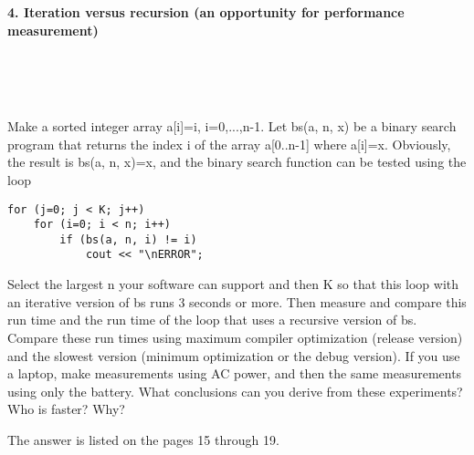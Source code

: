 \documentclass{article}
\begin{document}
\paragraph{}\
\paragraph{}\
\paragraph{}\

	\rmfamily
	
	\paragraph{4. Iteration versus recursion (an opportunity for performance measurement) }\
	
	\rmfamily\
	
		Make a sorted integer array a[i]=i, i=0,...,n-1.  Let bs(a, n, x) be a binary search program that returns the index i of the array a[0..n-1] where a[i]=x. Obviously, the result is bs(a, n, x)=x, and the binary search function can be tested using the loop
		
		\begin{verbatim}
for (j=0; j < K; j++)
    for (i=0; i < n; i++)
        if (bs(a, n, i) != i)
            cout << "\nERROR";
		\end{verbatim}
		
		
		Select the largest n your software can support and then K so that this loop with an iterative version of bs runs 3 seconds or more. Then measure and compare this run time and the run time of the loop that uses a recursive version of bs. Compare these run times using maximum compiler optimization (release version) and the slowest version (minimum optimization or the debug version). If you use a laptop, make measurements using AC power, and then the same measurements using only the battery. What conclusions can you derive from these experiments? Who is faster? Why?
		\newline
		
		The answer is listed on the pages 15 through 19.
	

\paragraph{}\
\paragraph{}\
\end{document}

